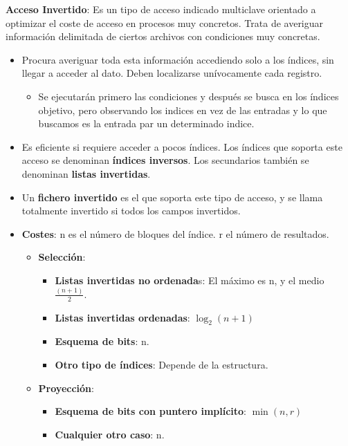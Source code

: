 \documentclass[12pt, twoside, openright]{report} %
\begin{document}
  \pagebreak
  \textbf{Acceso Invertido}: Es un tipo de acceso indicado multiclave
  orientado a optimizar el coste de acceso en procesos muy concretos.
  Trata de averiguar información delimitada de ciertos archivos con
  condiciones muy concretas.
  

  \begin{itemize}
  \item Procura averiguar toda esta información accediendo solo a los
    índices, sin llegar a acceder al dato. Deben localizarse
    unívocamente cada registro.
    

    \begin{itemize}
    \item Se ejecutarán primero las condiciones y después se busca en los
      índices objetivo, pero observando los indices en vez de las
      entradas y lo que buscamos es la entrada par un determinado
      indice.
      
    \end{itemize}
  \item Es eficiente si requiere acceder a pocos índices. Los índices que
    soporta este acceso se denominan \textbf{índices inversos}. Los
    secundarios también se denominan \textbf{listas invertidas}.
    
  \item Un \textbf{fichero invertido} es el que soporta este tipo de acceso,
    y se llama totalmente invertido si todos los campos invertidos.
    
  \item \textbf{Costes}: n es el número de bloques del índice. r el número
    de resultados.
    

    \begin{itemize}
    \item \textbf{Selección}:
      

      \begin{itemize}
      \item \textbf{Listas invertidas no ordenada}s: El máximo es n, y el
        medio $\frac{(n+1)}{2}$.
        
      \item \textbf{Listas invertidas ordenadas}: $\log_2(n+1)$
        
      \item \textbf{Esquema de bits}: n.
        
      \item \textbf{Otro tipo de índices}: Depende de la estructura.
        
      \end{itemize}
    \item \textbf{Proyección}:
      

      \begin{itemize}
      \item \textbf{Esquema de bits con puntero implícito}: $\min(n, r)$
        
      \item \textbf{Cualquier otro caso}: n.
        
      \end{itemize}
    \end{itemize}
  \end{itemize}
\end{document}
